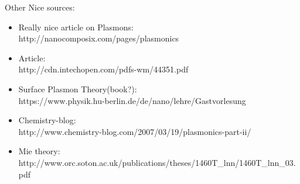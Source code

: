 Other Nice sources:
\begin{itemize}
\item Really nice article on Plasmons:\\
http://nanocomposix.com/pages/plasmonics

\item Article:\\
http://cdn.intechopen.com/pdfs-wm/44351.pdf

\item Surface Plasmon Theory(book?):\\
https://www.physik.hu-berlin.de/de/nano/lehre/Gastvorlesung%

\item Chemistry-blog:\\
http://www.chemistry-blog.com/2007/03/19/plasmonics-part-ii/

\item Mie theory: \\
http://www.orc.soton.ac.uk/publications/theses/1460T\_lnn/1460T\_lnn\_03.pdf
\end{itemize}





